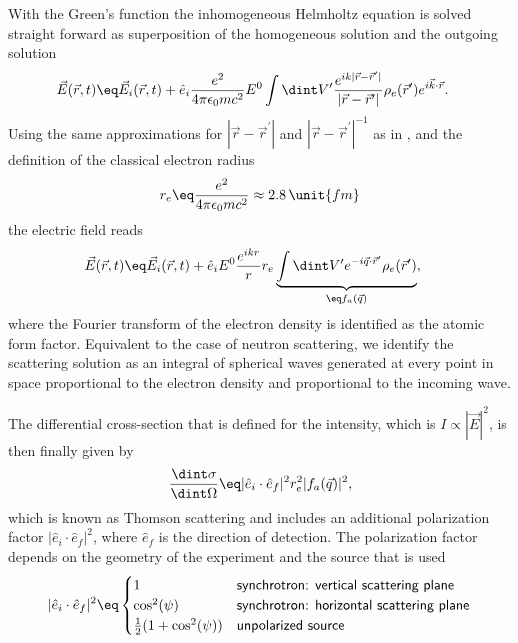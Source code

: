 \documentclass[\main/dresen_thesis.tex]{subfiles}
\begin{document}
With the Green's function the inhomogeneous Helmholtz equation is solved straight forward as superposition of the homogeneous solution and the outgoing solution
\begin{align}
  \vec{E} (\vec{r}, t) \eq& \vec{E}_i(\vec{r}, t) + \hat{e}_i \frac{e^2}{4\pi \epsilon_0 m c^2} E^0 \int \dint V^\prime \frac{e^{i k |\vec{r} - \vec{r}^\prime|}}{|\vec{r} - \vec{r}^\prime|} \rho_e (\vec{r}^\prime) e^{i\vec{k}\cdot \vec{r}}.
\end{align}
Using the same approximations for $|\vec{r} - \vec{r}^\prime|$ and $|\vec{r} - \vec{r}^\prime|^{-1}$ as in , and the definition of the classical electron radius
\begin{align}
  r_e \eq \frac{e^2}{4\pi \epsilon_0 m c^2} \approx 2.8 \, \unit{fm}
\end{align}
the electric field reads
\begin{align}
  \vec{E} (\vec{r}, t) \eq& \vec{E}_i(\vec{r}, t) + \hat{e}_i E^0   \frac{e^{ik r}}{r} r_e \underbrace{\int \dint V^\prime e^{-i \vec{q} \cdot  \vec{r}^\prime}  \rho_e (\vec{r}^\prime)}_{\eq f_a(\vec{q})},
\end{align}
where the Fourier transform of the electron density is identified as the atomic form factor.
Equivalent to the case of neutron scattering, we identify the scattering solution as an integral of spherical waves generated at every point in space proportional to the electron density and proportional to the incoming wave.

The differential cross-section that is defined for the intensity, which is $I \propto |\vec{E}|^2$, is then finally given by
\begin{align}
  \frac{\dint \sigma}{\dint \Omega} \eq |\hat{e}_i \cdot \hat{e}_f|^2 r_e^2 |f_a(\vec{q})|^2,
\end{align}
which is known as Thomson scattering and includes an additional polarization factor $|\hat{e}_i \cdot \hat{e}_f|^2$, where $\hat{e}_f$ is the direction of detection.
The polarization factor depends on the geometry of the experiment and the source that is used \cite{AlsNielsen_2011_Eleme}
\begin{align}
  |\hat{e}_i \cdot \hat{e}_f|^2 \eq \begin{cases}
    1 & \textsf{synchrotron: vertical scattering plane} \\
    \cos^2(\psi) & \textsf{synchrotron: horizontal scattering plane}\\
    \frac{1}{2} (1+\cos^2(\psi)) & \textsf{unpolarized source}
  \end{cases}
\end{align}
\end{document}
